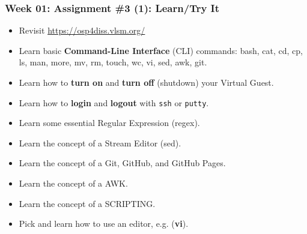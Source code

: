 \documentclass[xcolor=table, notheorems, hyperref={pdfpagelabels=false}]{beamer}
\begin{document}
\begin{frame}[fragile]
\frametitle{Week 01: Assignment \#3 (1): Learn/Try It}
\begin{itemize}
\item Revisit \url{https://osp4diss.vlsm.org/}
\item Learn basic \textbf{Command-Line Interface} (CLI) commands:
bash,
cat, 
cd, 
cp, 
ls, 
man,
more, 
mv, 
rm, 
touch, 
wc,
vi,
sed,
awk,
git.
\item Learn how to \textbf{turn on} and \textbf{turn off} (shutdown) your Virtual Guest.
\item Learn how to \textbf{login} and \textbf{logout} with \texttt{ssh} or \texttt{putty}.
\item Learn some essential Regular Expression (regex).
\item Learn the concept of a Stream Editor (sed).
\item Learn the concept of a Git, GitHub, and GitHub Pages.
\item Learn the concept of a AWK.
\item Learn the concept of a SCRIPTING.
\item Pick and learn how to use an editor, e.g. (\textbf{vi}).
\end{itemize}
\end{frame}
\end{document}
